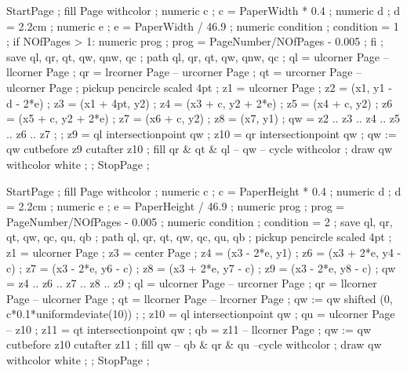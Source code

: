 \setupcolors[textcolor=simpleslides:textcolor]


StartPage ;
fill Page withcolor  ;
numeric c ; c = PaperWidth * 0.4 ;
numeric d ; d = 2.2cm ;
numeric e ; e = PaperWidth / 46.9 ;
numeric condition ; condition = 1 ;
if NOfPages > 1:
  numeric prog ; prog = PageNumber/NOfPages - 0.005 ;
fi ;
save ql, qr, qt, qw, qnw, qc ; path ql, qr, qt, qw, qnw, qc ;
ql = ulcorner Page -- llcorner Page ;
qr = lrcorner Page -- urcorner Page ;
qt = urcorner Page -- ulcorner Page ;
pickup pencircle scaled 4pt ;
z1 = ulcorner Page ;
z2 = (x1, y1 - d - 2*e) ;
z3 = (x1 + 4pt, y2) ;
z4 = (x3 + c, y2 + 2*e) ;
z5 = (x4 + c, y2) ;
z6 = (x5 + c, y2 + 2*e) ;
z7 = (x6 + c, y2) ;
z8 = (x7, y1) ;
qw = z2 .. z3 .. z4 .. z5 .. z6 .. z7 ;
 ;
z9 = ql intersectionpoint qw ;
z10 = qr intersectionpoint qw ;
qw := qw cutbefore z9 cutafter z10 ;
fill qr & qt & ql -- qw -- cycle withcolor  ; 
draw qw withcolor white ;
 ;
StopPage ;
\stopuseMPgraphic 

StartPage ;
fill Page withcolor  ;
numeric c ; c = PaperHeight * 0.4 ;
numeric d ; d = 2.2cm ;
numeric e ; e = PaperHeight / 46.9 ;
numeric prog ; prog = PageNumber/NOfPages - 0.005 ;
numeric condition ; condition = 2 ;
save ql, qr, qt, qw, qc, qu, qb ; path ql, qr, qt, qw, qc, qu, qb ;
pickup pencircle scaled 4pt ;
z1 = ulcorner Page ;
z3 = center Page ;
z4 = (x3 - 2*e, y1) ;
z6 = (x3 + 2*e, y4 - c) ;
z7 = (x3 - 2*e, y6 - c) ;
z8 = (x3 + 2*e, y7 - c) ;
z9 = (x3 - 2*e, y8 - c) ;
qw = z4 .. z6 .. z7 .. z8 .. z9 ;
ql = ulcorner Page -- urcorner Page ;
qr = llcorner Page -- ulcorner Page ;
qt = llcorner Page -- lrcorner Page ;
qw := qw shifted (0, c*0.1*uniformdeviate(10)) ; 
 ;
z10 = ql intersectionpoint qw ;
qu = ulcorner Page -- z10 ;
z11 = qt intersectionpoint qw ;
qb = z11 -- llcorner Page ;
qw := qw cutbefore z10 cutafter z11 ;
fill qw -- qb & qr & qu --cycle withcolor  ;
draw qw withcolor white ;
 ;
StopPage ;
\stopuseMPgraphic 




